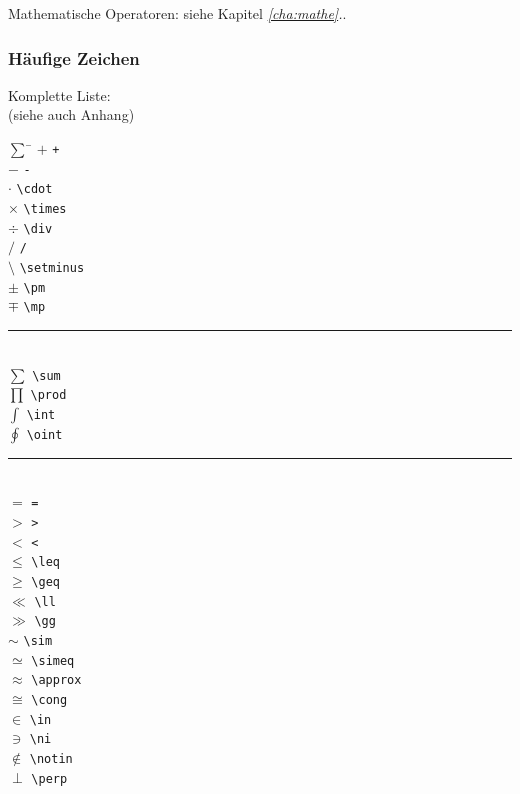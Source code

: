 Mathematische Operatoren: siehe Kapitel \emph{\ref{cha:mathe}.}.
\subsubsection{Häufige Zeichen}
Komplette Liste: 
\\ (siehe auch Anhang)
%
\begin{multicols}{3}
\begin{tabbing}
$\sum$ \hspace{0.3ex} 			\= \kill
$+$ 				\>		\lstinline|+|					\\
$-$ 				\>		\lstinline|-|					\\
\hspace{0.5ex}$\cdot$ 		\>		\lstinline|\cdot|			\\
$\times$ 		\>		\lstinline|\times|		\\
$\div$ 			\>		\lstinline|\div|			\\
$/$ 				\> 		\lstinline|/|			\\
$\setminus$ \>		\hspace{-0.4ex}\lstinline|\setminus|	\\
$\pm$ 			\>		\lstinline|\pm|				\\
$\mp$ 			\>		\lstinline|\mp|				\\

\rule{\linewidth}{0.5\arrayrulewidth}\\  
$\sum$ 			\>		\lstinline|\sum|			\\
$\prod$ 		\>		\lstinline|\prod|			\\
$\int$ 			\>		\lstinline|\int|			\\
$\oint$ 		\>		\lstinline|\oint| 		\\

\rule{\linewidth}{0.5\arrayrulewidth}\\  %

$=$ 						\>		\lstinline|=| 		\\
$>$ 						\>		\lstinline|>| 		\\
$<$ 						\>		\lstinline|<| 		\\
$\leq$ 					\>		\lstinline|\leq| 	\\
$\geq$ 					\>		\lstinline|\geq| 	\\
$\ll$ 					\>		\lstinline|\ll| 	\\
$\gg$ 					\>		\lstinline|\gg| 	\\
$\sim$ 					\>		\lstinline|\sim| 	\\
$\simeq$ 				\>		\lstinline|\simeq| 	\\
$\approx$ 			\>		\lstinline|\approx|	\\
$\cong$ 				\>		\lstinline|\cong| 	\\
$\in$ 					\>		\lstinline|\in| 		\\
$\ni$ 					\>		\lstinline|\ni| 		\\
$\notin$ 				\>		\lstinline|\notin| 	\\
$\perp$ 				\>		\lstinline|\perp| 	\\


\end{tabbing}
\end{multicols}
